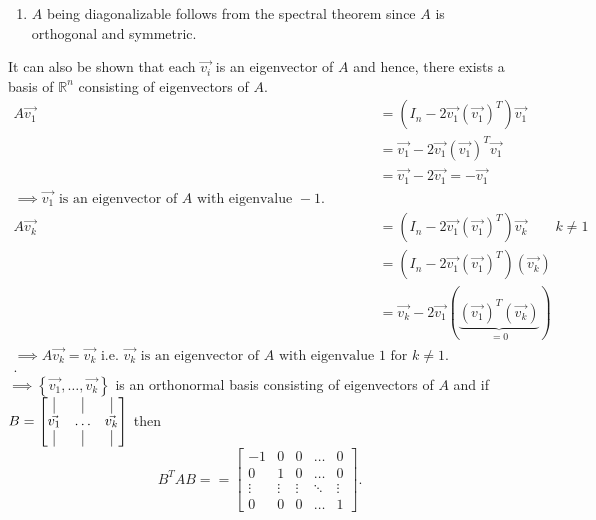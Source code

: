 \documentclass{report}
\begin{document}
{\begin{enumerate}[label=(\roman*).]
\begin{align*}
       &= I_n - 4 \left( \vec{ v_1}  \right) \left( \vec{ v_1}  \right) ^{T} + 4 \left( \vec{ v_1}  \right) \left( \vec{ v_1}  \right) ^{T} \left( \vec{ v_1}  \right) \left( \vec{ v_1}  \right) ^{T}\\
       &= I_n - 4 \left( \vec{ v_1}  \right) \left( \vec{ v_1}  \right) ^{T} + 4 \left( \vec{ v_1}  \right) \left( \vec{ v_1}  \right) ^{T}\\
       &= I_n\\ 
       &\implies A^{T}A = I_n \text{ i.e. } A \text{ is orthogonal.}
      .\end{align*}
     \item
      $ A$ being diagonalizable follows from the spectral theorem since $ A$ is orthogonal and symmetric. \\
   \end{enumerate}
   
   It can also be shown that each $ \vec{ v_i} $ is an eigenvector of $ A$  and hence, there exists a basis of $ \mathbb{R} ^{n}$ consisting of eigenvectors of $ A$. \\
   \begin{align*}
    A \vec{ v_1} &= \left( I_n - 2 \vec{ v_1} \left( \vec{ v_1}  \right) ^{T} \right) \vec{ v_1}\\
    &= \vec{ v_1} - 2 \vec{ v_1} \left( \vec{ v_1}  \right) ^{T} \vec{ v_1}\\
    &= \vec{ v_1} - 2 \vec{ v_1} = - \vec{ v_1}\\
    \implies \vec{ v_1} \text{ is an eigenvector of } A \text{ with eigenvalue } -1.\\
    A \vec{ v_k} &= \left( I_n - 2 \vec{ v_1} \left( \vec{ v_1}  \right) ^{T} \right) \vec{ v_k} \qquad  k \neq 1\\
    &= \left( I_n -2 \vec{ v_1} \left( \vec{ v_1}  \right) ^{T} \right) \left( \vec{ v_k} \right)\\
    &= \vec{ v_k} - 2 \vec{ v_1} \left( \underbrace{ \left( \vec{ v_1}  \right) ^{T} \left( \vec{ v_k}  \right)  }_{ =0 } \right)\\
    \implies A \vec{ v_k} = \vec{ v_k} 
    \text{ i.e. } \vec{ v_k} \text{ is an eigenvector of } A \text{ with eigenvalue } 1 \text{ for } k \neq 1.\\
   .\end{align*}
   $ \implies \left\{ \vec{ v_1} , \ldots , \vec{ v_k}  \right\} $  is an orthonormal basis consisting of eigenvectors of $ A$ and if $ B = \begin{bmatrix}
   \vline & \vline & \vline\\
   \vec{ v_1}  & \ldots & \vec{ v_k} \\
   \vline & \vline & \vline\\
   \end{bmatrix}$ then 
   \[
   B ^{ T} A B = = \begin{bmatrix}
       -1 & 0 & 0 & \dots  & 0 \\
       0 & 1 & 0 & \dots  & 0 \\
       \vdots & \vdots & \vdots & \ddots & \vdots \\
       0 & 0 & 0 & \dots  & 1\end{bmatrix}
   .\] 
     
     
  }
\end{document}
